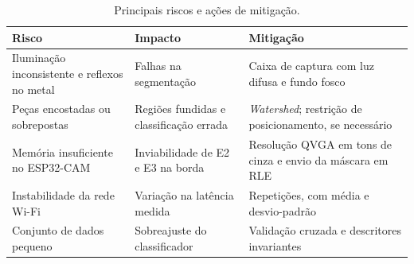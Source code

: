 \documentclass[12pt]{article}
\begin{document}
\begin{table}[H]
  \centering
  \caption{Principais riscos e ações de mitigação.}
  \label{tab:riscos}
  \begin{tabularx}{\textwidth}{>{\raggedright\arraybackslash}p{3.2cm} >{\raggedright\arraybackslash}p{3.4cm} >{\raggedright\arraybackslash}X}
    \toprule
    \textbf{Risco} & \textbf{Impacto} & \textbf{Mitigação} \\
    \midrule
    Iluminação inconsistente e reflexos no metal & Falhas na segmentação & Caixa de captura com luz difusa e fundo fosco \\
    Peças encostadas ou sobrepostas & Regiões fundidas e classificação errada & \textit{Watershed}; restrição de posicionamento, se necessário \\
    Memória insuficiente no ESP32-CAM & Inviabilidade de E2 e E3 na borda & Resolução QVGA em tons de cinza e envio da máscara em RLE \\
    Instabilidade da rede Wi-Fi & Variação na latência medida & Repetições, com média e desvio-padrão \\
    Conjunto de dados pequeno & Sobreajuste do classificador & Validação cruzada e descritores invariantes \\
    \bottomrule
  \end{tabularx}
\end{table}



\end{document}
